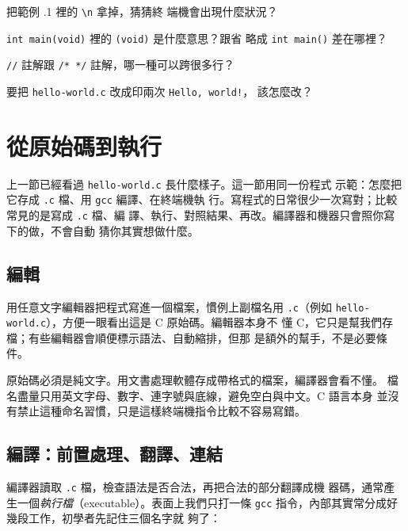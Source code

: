 
\begin{drills}[label=drills:intro-first-program]
\item 把範例 \thechapter.1 裡的 \texttt{\textbackslash n} 拿掉，猜猜終
端機會出現什麼狀況？
\item \texttt{int main(void)} 裡的 \texttt{(void)} 是什麼意思？跟省
略成 \texttt{int main()} 差在哪裡？
\item \texttt{//} 註解跟 \texttt{/* */} 註解，哪一種可以跨很多行？
\item 要把 \texttt{hello-world.c} 改成印兩次 \texttt{Hello, world!}，
該怎麼改？
\end{drills}

\section{從原始碼到執行}
\label{sec:intro-build-pipeline}

上一節已經看過 \texttt{hello-world.c} 長什麼樣子。這一節用同一份程式
示範：怎麼把它存成 \texttt{.c} 檔、用 \texttt{gcc} 編譯、在終端機執
行。寫程式的日常很少一次寫對；比較常見的是寫成 \texttt{.c} 檔、編
譯、執行、對照結果、再改。編譯器和機器只會照你寫下的做，不會自動
猜你其實想做什麼。

\subsection{編輯}

用任意文字編輯器把程式寫進一個檔案，慣例上副檔名用 \texttt{.c}（例如
\texttt{hello-world.c}），方便一眼看出這是 C 原始碼。編輯器本身不
懂 C，它只是幫我們存檔；有些編輯器會順便標示語法、自動縮排，但那
是額外的幫手，不是必要條件。

原始碼必須是純文字。用文書處理軟體存成帶格式的檔案，編譯器會看不懂。
檔名盡量只用英文字母、數字、連字號與底線，避免空白與中文。C 語言本身
並沒有禁止這種命名習慣，只是這樣終端機指令比較不容易寫錯。

\subsection{編譯：前置處理、翻譯、連結}

編譯器讀取 \texttt{.c} 檔，檢查語法是否合法，再把合法的部分翻譯成機
器碼，通常產生一個\emph{執行檔}（executable）。表面上我們只打一條
\texttt{gcc} 指令，內部其實常分成好幾段工作，初學者先記住三個名字就
夠了：


